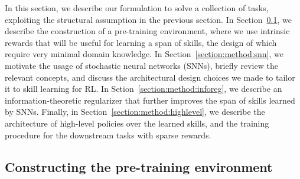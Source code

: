 \documentclass{article} %
\begin{document}
In this section, we describe our formulation to solve a collection of tasks, exploiting the structural assumption in the previous section. In Section~\ref{section:method:pretraining}, we describe the construction of a pre-training environment, where we use intrinsic rewards that will be useful for learning a span of skills, the design of which require very minimal domain knowledge. In Section~\ref{section:method:snn}, we motivate the usage of stochastic neural networks (SNNs), briefly review the relevant concepts, and discuss the architectural design choices we made to tailor it to skill learning for RL. 
In Setion~\ref{section:method:inforeg}, we describe an information-theoretic regularizer that further improves the span of skills learned by SNNs. Finally, in Section~\ref{section:method:highlevel}, we describe the architecture of high-level policies over the learned skills, and the training procedure for the downstream tasks with sparse rewards.%





\subsection{Constructing the pre-training environment}%
\label{section:method:pretraining}
\end{document}
